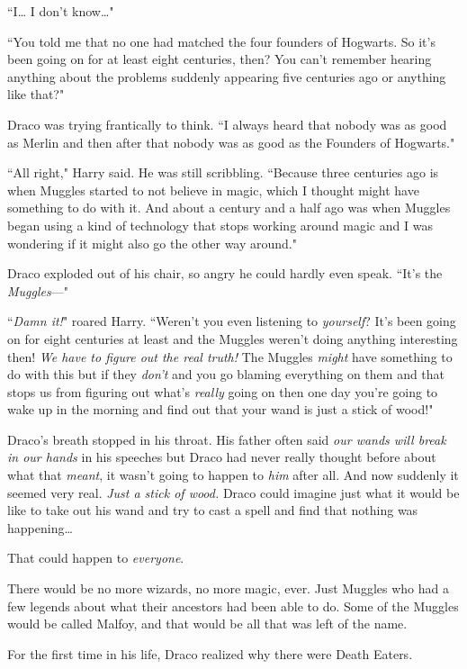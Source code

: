 ``I{\ldots} I don't know{\ldots}"

``You told me that no one had matched the four founders of Hogwarts. So it's been going on for at least eight centuries, then? You can't remember hearing anything about the problems suddenly appearing five centuries ago or anything like that?"

Draco was trying frantically to think. ``I always heard that nobody was as good as Merlin and then after that nobody was as good as the Founders of Hogwarts."

``All right," Harry said. He was still scribbling. ``Because three centuries ago is when Muggles started to not believe in magic, which I thought might have something to do with it. And about a century and a half ago was when Muggles began using a kind of technology that stops working around magic and I was wondering if it might also go the other way around."

Draco exploded out of his chair, so angry he could hardly even speak. ``It's the \emph{Muggles}—"

``\emph{Damn it!}" roared Harry. ``Weren't you even listening to \emph{yourself}? It's been going on for eight centuries at least and the Muggles weren't doing anything interesting then! \emph{We have to figure out the real truth!} The Muggles \emph{might} have something to do with this but if they \emph{don't} and you go blaming everything on them and that stops us from figuring out what's \emph{really} going on then one day you're going to wake up in the morning and find out that your wand is just a stick of wood!"

Draco's breath stopped in his throat. His father often said \emph{our wands will break in our hands} in his speeches but Draco had never really thought before about what that \emph{meant}, it wasn't going to happen to \emph{him} after all. And now suddenly it seemed very real. \emph{Just a stick of wood.} Draco could imagine just what it would be like to take out his wand and try to cast a spell and find that nothing was happening{\ldots}

That could happen to \emph{everyone}.

There would be no more wizards, no more magic, ever. Just Muggles who had a few legends about what their ancestors had been able to do. Some of the Muggles would be called Malfoy, and that would be all that was left of the name.

For the first time in his life, Draco realized why there were Death Eaters.

